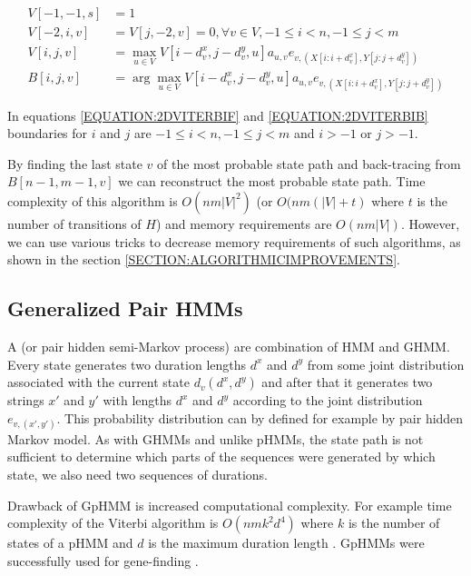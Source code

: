 \begin{align}
V[-1,-1,s] &= 1\\
V[-2,i,v] &= V[j,-2,v] = 0, \forall v\in V,-1 \leq i < n, -1\leq j < m\\
V[i,j,v] &= \max_{u\in
V}V[i-d^x_{v},j-d^y_v,u]a_{u,v}e_{v,(X[i:i+d^x_v],Y[j:j+d^y_v])}\label{EQUATION:2DVITERBIF}\\
B[i,j,v] &= \arg\max_{u\in
V}V[i-d^x_{v},j-d^y_v,u]a_{u,v}e_{v,(X[i:i+d^x_v],Y[j:j+d^y_v])}\label{EQUATION:2DVITERBIB}
\end{align}

In equations \ref{EQUATION:2DVITERBIF} and \ref{EQUATION:2DVITERBIB} boundaries for $i$ and $j$ are $
-1\leq i< n,-1\leq j< m$ and $i>-1$ or $j>-1$.


By finding the last state $v$ of the most probable state path and back-tracing
from $B[n-1,m-1,v]$ we can reconstruct the most probable state path. Time
complexity of this algorithm is $O(nm|V|^2)$ (or $O(nm(|V|+t)$ where $t$ is the
number of transitions of $H$) and memory requirements are $O(nm|V|)$. However,
we can use various tricks to decrease memory requirements of such algorithms, as
shown in the section \ref{SECTION:ALGORITHMICIMPROVEMENTS}.

\subsection{Generalized Pair HMMs}


A  (or pair hidden semi-Markov
process) are combination of HMM and GHMM. Every state generates two
duration lengths $d^x$ and $d^y$ from some joint distribution associated with
the current state $d_v(d^x,d^y)$ and after that it generates two strings $x'$
and $y'$ with lengths $d^x$ and $d^y$ according to the joint distribution
$e_{v,(x',y')}$. This probability distribution can by defined for example by
pair hidden Markov model.  As with GHMMs and unlike pHMMs, the state path is not
sufficient to determine which parts of the sequences were generated by which
state, we also need two sequences of durations.

Drawback of GpHMM is increased computational complexity. For example time
complexity of the Viterbi algorithm is $O(nmk^2d^4)$ where $k$
is the number of states of a pHMM and $d$ is the maximum duration length \cite{Meyer2002}.
GpHMMs were successfully used for gene-finding
\cite{SLAM2003,Alexanderson2004,Majoros2005,Meyer2002}. 

